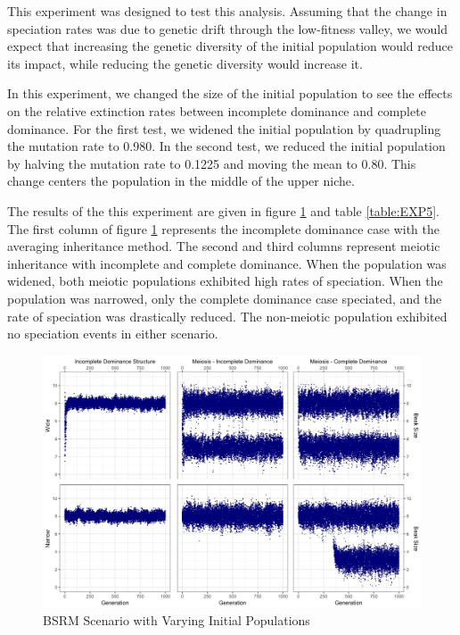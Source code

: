 \documentclass{article}
\begin{document}
This experiment was designed to test this analysis. Assuming that the change in speciation rates was due to genetic drift through the low-fitness valley, we would expect that increasing the genetic diversity of the initial population would reduce its impact, while reducing the genetic diversity would increase it.

In this experiment, we changed the size of the initial population to see the effects on the relative extinction rates between incomplete dominance and complete dominance. For the first test, we widened the initial population by quadrupling the mutation rate to 0.980. In the second test, we reduced the initial population by halving the mutation rate to 0.1225 and moving the mean to 0.80. This change centers the population in the middle of the upper niche.

The results of the this experiment are given in figure \ref{fig:EXP5} and table \ref{table:EXP5}. The first column of figure \ref{fig:EXP5} represents the incomplete dominance case with the averaging inheritance method. The second and third columns represent meiotic inheritance with incomplete and complete dominance. When the population was widened, both meiotic populations exhibited high rates of speciation. When the population was narrowed, only the complete dominance case speciated, and the rate of speciation was drastically reduced. The non-meiotic population exhibited no speciation events in either scenario. 

\begin{figure}
    \centering
    \includegraphics[width=\linewidth]{Data/EXP5}
    \caption{BSRM Scenario with Varying Initial Populations}
    \label{fig:EXP5}
\end{figure}
\end{document}
